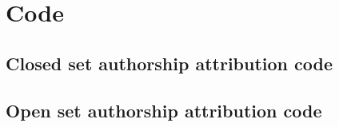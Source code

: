 \appendix
\chapter{Code}

\section{Closed set authorship attribution code}

%


\section{Open set authorship attribution code}

%

\listoffigures
\listoftables